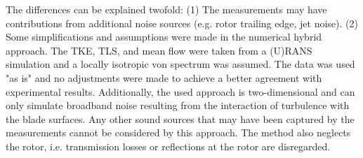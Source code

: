 The differences can be explained twofold: (1) The measurements may have contributions from additional noise sources (e.g. rotor trailing edge, jet noise).
(2) Some simplifications and assumptions were made in the numerical hybrid approach. The TKE, TLS, and mean flow were taken from a (U)RANS simulation and a locally isotropic von \Karman spectrum was assumed.  The data was used "as is" and no adjustments were made to achieve a better agreement with experimental results.  Additionally, the used approach is two-dimensional and can only simulate broadband noise resulting from the interaction of turbulence with the blade surfaces.  Any other sound sources that may have been captured by the measurements cannot be considered by this approach.  The method also neglects the rotor, i.e. transmission losses or reflections at the rotor are disregarded.  %

